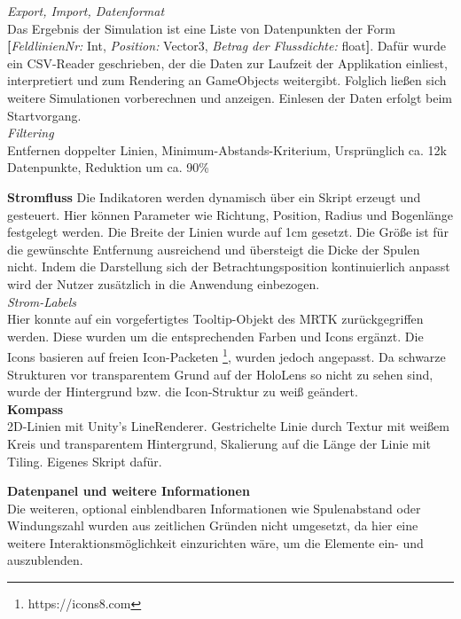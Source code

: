 \textit{Export, Import, Datenformat}\\
Das Ergebnis der Simulation ist eine Liste von Datenpunkten der Form \textbf{[}\textit{FeldlinienNr:} Int, \textit{Position:} Vector3, \textit{Betrag der Flussdichte:} float\textbf{]}. Dafür wurde ein CSV-Reader geschrieben, der die Daten zur Laufzeit der Applikation einliest, interpretiert und zum Rendering an GameObjects weitergibt. Folglich ließen sich weitere Simulationen vorberechnen und anzeigen. Einlesen der Daten erfolgt beim Startvorgang.\\

\textit{Filtering}\\
Entfernen doppelter Linien, Minimum-Abstands-Kriterium, Ursprünglich ca. 12k Datenpunkte, Reduktion um ca. 90\% 

\textbf{Stromfluss}
Die Indikatoren werden dynamisch über ein Skript erzeugt und gesteuert. Hier können Parameter wie Richtung, Position, Radius und Bogenlänge festgelegt werden. Die Breite der Linien wurde auf 1cm gesetzt. Die Größe ist für die gewünschte Entfernung ausreichend und übersteigt die Dicke der Spulen nicht. Indem die Darstellung sich der Betrachtungsposition kontinuierlich anpasst wird der Nutzer zusätzlich in die Anwendung einbezogen.\\

\textit{Strom-Labels}\\
Hier konnte auf ein vorgefertigtes Tooltip-Objekt des MRTK zurückgegriffen werden. Diese wurden um die entsprechenden Farben und Icons ergänzt. Die Icons basieren auf freien Icon-Packeten \footnote{https://icons8.com}, wurden jedoch angepasst. Da schwarze Strukturen vor transparentem Grund auf der HoloLens so nicht zu sehen sind, wurde der Hintergrund bzw. die Icon-Struktur zu weiß geändert.\\

\textbf{Kompass}\\
2D-Linien mit Unity's LineRenderer. Gestrichelte Linie durch Textur mit weißem Kreis und transparentem Hintergrund, Skalierung auf die Länge der Linie mit Tiling. Eigenes Skript dafür.

\textbf{Datenpanel und weitere Informationen}\\
Die weiteren, optional einblendbaren Informationen wie Spulenabstand oder Windungszahl wurden aus zeitlichen Gründen nicht umgesetzt, da hier eine weitere Interaktionsmöglichkeit einzurichten wäre, um die Elemente ein- und auszublenden.


